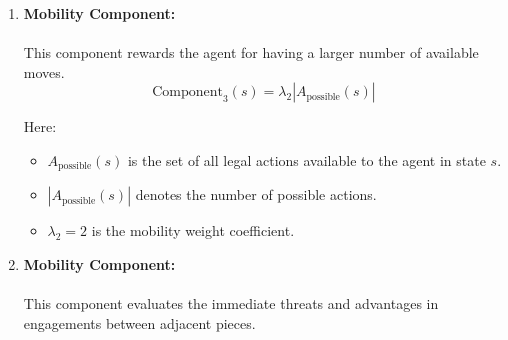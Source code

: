 \documentclass{article}
\begin{document}
\begin{enumerate}
            
            
    \item  \textbf{Mobility Component:}
            \\
            \\
            This component rewards the agent for having a larger number of available moves.
            \begin{equation}
                \label{eq:mobility}
                \text{Component}_3(s) = \lambda_2 |A_{\text{possible}}(s)|
            \end{equation}

            
            Here:
            \begin{itemize}
                \item $A_{\text{possible}}(s)$ is the set of all legal actions available to the agent in state $s$.
                \item $|A_{\text{possible}}(s)|$ denotes the number of possible actions.
                \item $\lambda_2 = 2$ is the mobility weight coefficient.
            \end{itemize}
            
    \item  \textbf{Mobility Component:}
            \\
            \\
            This component evaluates the immediate threats and advantages in engagements between adjacent pieces.


\end{enumerate}
\end{document}
